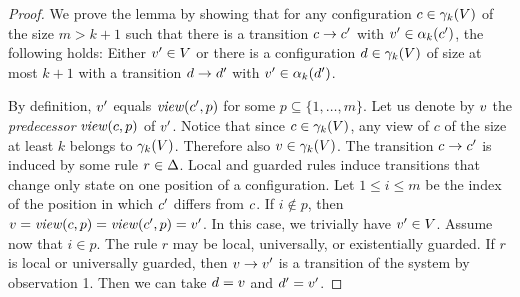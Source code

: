 \begin{proof}
%
We prove the lemma by showing that for any configuration $\conf\in\gammaof k(V)$ of the size $m > k+1$
%
such that there is a transition $\conf\trans\conf'$ with $\view'\in \projof {\conf'} k$, 
%
the following holds:
%
Either $\view'\in V$
%
or there is a configuration $\confd\in\gammaof k (V)$ of size at most $k+1$
%
with a transition $\confd\trans\confd'$ with $\view'\in \projof {\confd'} k$. 

By definition, 
%
$\view'$ equals $\viewof {\conf'} p$ for some $p\subseteq\{1,\ldots,m\}$.
%
Let us denote by $\view$ the \emph{predecessor} $\viewof {\conf} p$ of $\view'$.
%
Notice that since $c\in\gammaof k(V)$, 
any view of $c$ of the size at least $k$ belongs to $\gammaof k(V)$.
%
Therefore also $\view\in\gammaof k(V)$.
%
The transition $\conf\trans\conf'$ is induced by some rule $r\in\rules$.
%
Local and guarded rules induce transitions that change only state on one position of a configuration. 
%
Let $1\leq i\leq m$ be the index of the position in which $\conf'$ differs from $\conf$.
%
If $i\not\in p$, then $\view = \viewof {\conf} p = \viewof {\conf'} p = \view'$. 
%
In this case, we trivially have $\view'\in V$. 
%
Assume now that $i\in p$.
%
The rule $r$ may be local, universally, or existentially guarded.
%
If $r$ is local or universally guarded, 
%
then $\view\trans\view'$ is a transition of the system by observation 1. 
%
Then we can take $\confd = \view$ and $\confd'=\view'$.
%
%
%
%


\end{proof}
